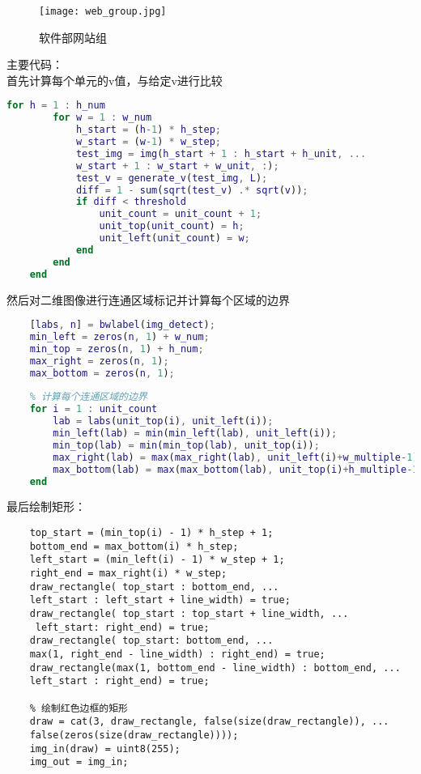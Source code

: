 \documentclass[12pt]{article}
\begin{document}
\begin{figure}[H]
    \centering
    \texttt{[image: web\_group.jpg]}
    \caption{软件部网站组}
\end{figure}

主要代码：\\
\hspace*{2em}首先计算每个单元的v值，与给定v进行比较
\begin{lstlisting}[language=matlab]
    for h = 1 : h_num
        for w = 1 : w_num
            h_start = (h-1) * h_step;
            w_start = (w-1) * w_step;
            test_img = img(h_start + 1 : h_start + h_unit, ... 
            w_start + 1 : w_start + w_unit, :);
            test_v = generate_v(test_img, L);
            diff = 1 - sum(sqrt(test_v) .* sqrt(v));
            if diff < threshold
                unit_count = unit_count + 1;
                unit_top(unit_count) = h;
                unit_left(unit_count) = w;
            end
        end
    end
\end{lstlisting}

然后对二维图像进行连通区域标记并计算每个区域的边界

\begin{lstlisting}[language=matlab]
    % 对二值图像进行连通区域标记
    [labs, n] = bwlabel(img_detect);
    min_left = zeros(n, 1) + w_num;
    min_top = zeros(n, 1) + h_num;
    max_right = zeros(n, 1);
    max_bottom = zeros(n, 1);
    
    % 计算每个连通区域的边界
    for i = 1 : unit_count
        lab = labs(unit_top(i), unit_left(i));
        min_left(lab) = min(min_left(lab), unit_left(i));
        min_top(lab) = min(min_top(lab), unit_top(i));
        max_right(lab) = max(max_right(lab), unit_left(i)+w_multiple-1);
        max_bottom(lab) = max(max_bottom(lab), unit_top(i)+h_multiple-1);
    end
\end{lstlisting}

最后绘制矩形：
\begin{lstlisting}
    top_start = (min_top(i) - 1) * h_step + 1;
    bottom_end = max_bottom(i) * h_step;
    left_start = (min_left(i) - 1) * w_step + 1;
    right_end = max_right(i) * w_step;
    draw_rectangle( top_start : bottom_end, ... 
    left_start : left_start + line_width) = true;
    draw_rectangle( top_start : top_start + line_width, ... 
     left_start: right_end) = true;
    draw_rectangle( top_start: bottom_end, ... 
    max(1, right_end - line_width) : right_end) = true;
    draw_rectangle(max(1, bottom_end - line_width) : bottom_end, ... 
    left_start : right_end) = true;
    
    % 绘制红色边框的矩形
    draw = cat(3, draw_rectangle, false(size(draw_rectangle)), ... 
    false(zeros(size(draw_rectangle))));
    img_in(draw) = uint8(255);
    img_out = img_in;
\end{lstlisting}
\end{document}
